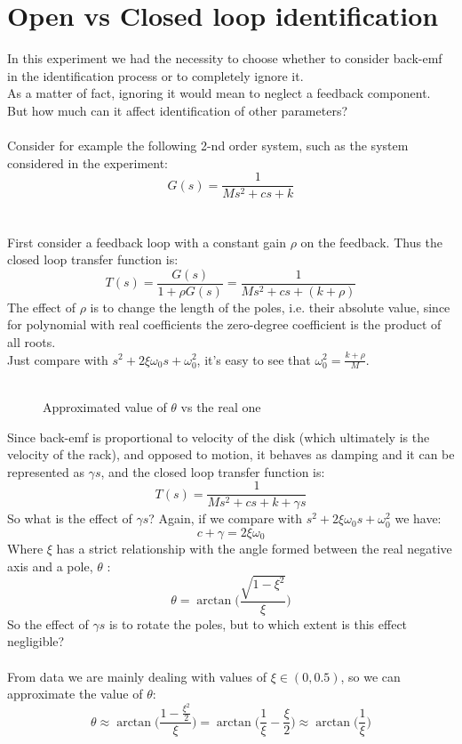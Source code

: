 \section{Open vs Closed loop identification}
\label{olvscl}
In this experiment we had the necessity to choose whether to consider back-emf in the identification process or to completely ignore it. \\
As a matter of fact, ignoring it would mean to neglect a feedback component. But how much can it affect identification of other parameters?
\\ \\
Consider for example the following 2-nd order system, such as the system considered in the experiment:
$$G(s) = \frac{1}{Ms^2+cs+k}$$
\\ \\
First consider a feedback loop with a constant gain $\rho$ on the feedback. Thus the closed loop transfer function is:
$$T(s) = \frac{G(s)}{1+\rho G(s)} = \frac{1}{Ms^2+cs+(k+\rho )}$$
The effect of $\rho$ is to change the length of the poles, i.e. their absolute value, since for polynomial with real coefficients the zero-degree coefficient is the product of all roots. \\
Just compare with $s^2+2\xi \omega_0 s+ \omega_0^2$, it's easy to see that $\omega_0^2 = \frac{k+\rho}{M}$.
\\\ \\
\begin{wrapfigure}{r}{0.4\textwidth}
\caption{Approximated value of $\theta$ vs the real one} \label{fig:theta_comparison}
\end{wrapfigure}
Since back-emf is proportional to velocity of the disk (which ultimately is the velocity of the rack), and opposed to motion, it behaves as damping and it can be represented as $\gamma s$, and the closed loop transfer function is:
$$T(s) = \frac{1}{Ms^2+cs+k+\gamma s}$$
So what is the effect of $\gamma s$?
Again, if we compare with $s^2+2\xi \omega_0 s+ \omega_0^2$ we have:
$$c+\gamma = 2\xi \omega_0$$
Where $\xi$ has a strict relationship with the angle formed between the real negative axis and a pole,  $\theta$ :
$$\theta = \arctan \Big(\frac{\sqrt{1-\xi^2}}{\xi} \Big)$$
So the effect of $\gamma s$ is to rotate the poles, but to which extent is this effect negligible? \\ \\
From data we are mainly dealing with values of $\xi \in (0, 0.5)$, so we can approximate the value of $\theta$:
$$\theta \approx \arctan \Big(\frac{1-\frac{\xi^2}{2}}{\xi} \Big) = \arctan \Big(\frac{1}{\xi}-\frac{\xi}{2} \Big) \approx \arctan \Big (\frac{1}{\xi} \Big)$$

